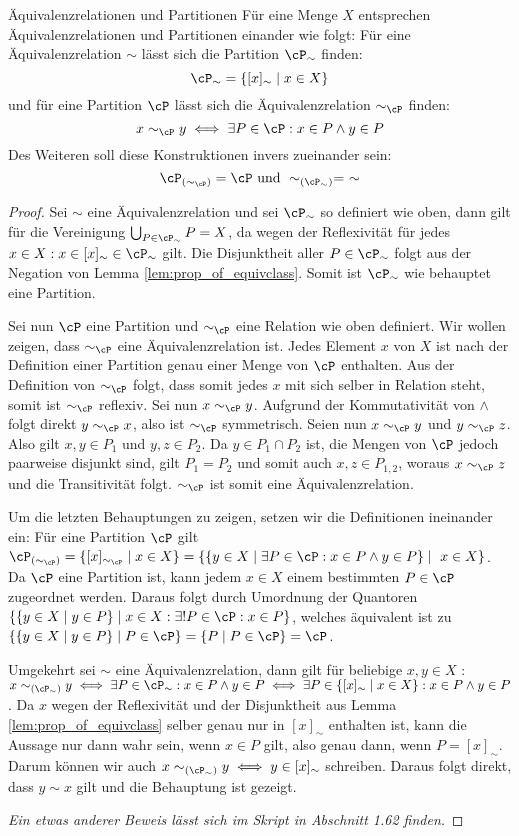 \begin{satz}{Äquivalenzrelationen und Partitionen}{}
Für eine Menge $X$ entsprechen Äquivalenzrelationen und Partitionen einander wie folgt: Für eine Äquivalenzrelation $\sim$ lässt sich die Partition $\cP_\sim$ finden:
$$\cP_\sim = \{[x]_\sim \mid x \in X \}$$
und für eine Partition $\cP$ lässt sich die Äquivalenzrelation $\sim_\cP$ finden:
$$x \sim_\cP y \iff \exists P \in \cP: x \in P \land y \in P$$
Des Weiteren soll diese Konstruktionen invers zueinander sein:
$$\cP_{(\sim_\cP)} = \cP \text{ und } \sim_{(\cP_\sim)} =\ \sim$$
\end{satz}
\begin{proof} Sei $\sim$ eine Äquivalenzrelation und sei $\cP_\sim$ so definiert wie oben, dann gilt für die Vereinigung $\bigcup_{P \in \cP_\sim} P = X$, da wegen der Reflexivität für jedes $x \in X: x \in [x]_\sim \in \cP_\sim$ gilt. Die Disjunktheit aller $P \in \cP_\sim$ folgt aus der Negation von Lemma \ref{lem:prop_of_equivclass}. Somit ist $\cP_\sim$ wie behauptet eine Partition.

Sei nun $\cP$ eine Partition und $\sim_\cP$ eine Relation wie oben definiert. Wir wollen zeigen, dass $\sim_\cP$ eine Äquivalenzrelation ist. Jedes Element $x$ von $X$ ist nach der Definition einer Partition genau einer Menge von $\cP$ enthalten. Aus der Definition von $\sim_\cP$ folgt, dass somit jedes $x$ mit sich selber in Relation steht, somit ist $\sim_\cP$ reflexiv. Sei nun $x \sim_\cP y$. Aufgrund der Kommutativität von $\land$ folgt direkt $y \sim_\cP x$, also ist $\sim_\cP$ symmetrisch. Seien nun $x \sim_\cP y$ und $y \sim_\cP z$. Also gilt $x,y \in P_1$ und $y,z \in P_2$. Da $y \in P_1 \cap P_2$ ist, die Mengen von $\cP$ jedoch paarweise disjunkt sind, gilt $P_1 = P_2$ und somit auch $x,z \in P_{1,2}$, woraus $x \sim_\cP z$ und die Transitivität folgt. $\sim_\cP$ ist somit eine Äquivalenzrelation.

Um die letzten Behauptungen zu zeigen, setzen wir die Definitionen ineinander ein: Für eine Partition $\cP$ gilt $\cP_{(\sim_\cP)} = \{[x]_{\sim_\cP} \mid x \in X\} = \{\{y \in X \mid  \exists P \in \cP: x \in P \land y \in P \} \mid \ x \in X\}$. Da $\cP$ eine Partition ist, kann jedem $x \in X$ einem bestimmten $P \in \cP$ zugeordnet werden. Daraus folgt durch Umordnung der Quantoren $\{\{y \in X \mid y \in P \} \mid x \in X: \exists! P \in \cP: x \in P\}$, welches äquivalent ist zu $\{\{y \in X \mid y \in P \} \mid P \in \cP\} = \{P \mid P \in \cP\} = \cP$.

Umgekehrt sei $\sim$ eine Äquivalenzrelation, dann gilt für beliebige $x,y \in X$ : $x \sim_{(\cP_\sim)} y \iff \exists P \in \cP_\sim: x \in P \land y \in P \iff \exists P \in \{[x]_\sim \mid x \in X \}: x \in P \land y \in P $. Da $x$ wegen der Reflexivität und der Disjunktheit aus Lemma \ref{lem:prop_of_equivclass} selber genau nur in $[x]_\sim$ enthalten ist, kann die Aussage nur dann wahr sein, wenn $x \in P$ gilt, also genau dann, wenn $P = [x]_\sim$. Darum können wir auch $x \sim_{(\cP_\sim)} y \iff y \in [x]_\sim $ schreiben. Daraus folgt direkt, dass $y \sim x$ gilt und die Behauptung ist gezeigt.

\textit{Ein etwas anderer Beweis lässt sich im Skript in Abschnitt 1.62 finden.}
\end{proof}

